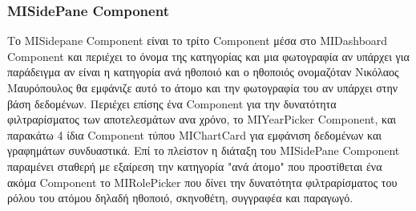 \subsubsection{MISidePane Component}
Το ΜΙSidepane Component είναι το τρίτο Component μέσα στο MIDashboard Component και περιέχει το όνομα της κατηγορίας και μια φωτογραφία αν υπάρχει
για παράδειγμα αν είναι η κατηγορία ανά ηθοποιό και ο ηθοποιός ονομαζόταν Νικόλαος Μαυρόπουλος θα εμφάνιζε αυτό το άτομο και την φωτογραφία του αν υπάρχει στην βάση δεδομένων. Περιέχει επίσης ένα Component για την δυνατότητα φιλτραρίσματος των αποτελεσμάτων ανα χρόνο, το MIYearPicker Component, και παρακάτω 4 ίδια Component τύπου MIChartCard για εμφάνιση δεδομένων και γραφημάτων συνδυαστικά. Επί το πλείστον η διάταξη του MISidePane Component παραμένει σταθερή με εξαίρεση την κατηγορία "ανά άτομο" που προστίθεται ένα ακόμα Component το MIRolePicker που δίνει την δυνατότητα φιλτραρίσματος του ρόλου του ατόμου δηλαδή ηθοποιό, σκηνοθέτη, συγγραφέα και παραγωγό.






